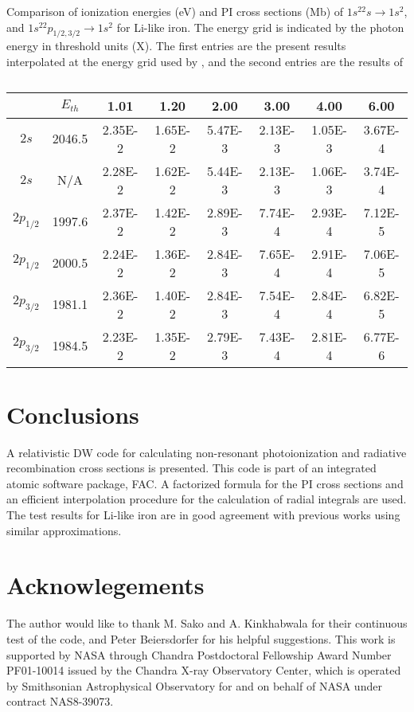 \documentclass{elsart}
\begin{document}
\begin{table}
\caption{\label{tab_comparison}}
Comparison of ionization energies (eV) and PI cross sections (Mb) of
$1s^22s$$\rightarrow$$1s^2$, and $1s^22p_{1/2,3/2}$$\rightarrow$$1s^2$ for
Li-like iron. The energy grid is indicated by the photon energy in threshold
units (X).  The first entries are the present results interpolated at the
energy grid used by \citet{zhang98}, and the second entries
are the results of \citet{zhang98}

\begin{tabular}{*{8}{c}}
\hline\hline
&$E_{th}$&1.01&1.20&2.00&3.00&4.00&6.00\\
\hline
$2s$&2046.5&2.35E-2&1.65E-2&5.47E-3&2.13E-3&1.05E-3&3.67E-4\\
$2s$&N/A&2.28E-2&1.62E-2&5.44E-3&2.13E-3&1.06E-3&3.74E-4\\
$2p_{1/2}$&1997.6&2.37E-2&1.42E-2&2.89E-3&7.74E-4&2.93E-4&7.12E-5\\
$2p_{1/2}$&2000.5&2.24E-2&1.36E-2&2.84E-3&7.65E-4&2.91E-4&7.06E-5\\
$2p_{3/2}$&1981.1&2.36E-2&1.40E-2&2.84E-3&7.54E-4&2.84E-4&6.82E-5\\
$2p_{3/2}$&1984.5&2.23E-2&1.35E-2&2.79E-3&7.43E-4&2.81E-4&6.77E-6\\
\hline\hline
\end{tabular}
\end{table}

\section{Conclusions}
A relativistic DW code for calculating non-resonant photoionization and
radiative recombination cross sections is presented. This code is part of an
integrated atomic software package, FAC. A factorized formula for the PI cross
sections and an efficient interpolation procedure for the calculation of
radial integrals are used. The 
test results for Li-like iron are in good agreement with previous works using
similar approximations.  

\section*{Acknowlegements}
The author would like to thank M. Sako and A. Kinkhabwala for their continuous
test of the code, and Peter Beiersdorfer for his helpful suggestions. 
This work is supported by
NASA through Chandra Postdoctoral Fellowship Award Number PF01-10014 issued by
the Chandra X-ray Observatory Center, which is operated by Smithsonian
Astrophysical Observatory for and on behalf of NASA under contract NAS8-39073.



\end{document}
